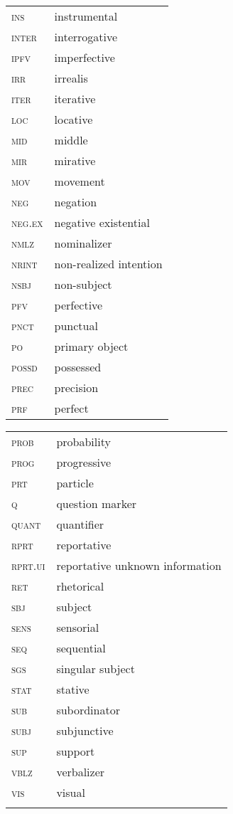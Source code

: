 \documentclass[output=paper,draft,draftmode,colorlinks,citecolor=brown]{langscibook}
\begin{document}
\begin{tabularx}{.45\textwidth}{lQ}
    \textsc{ins}& instrumental\\
    \textsc{inter}& interrogative\\
    \textsc{ipfv}& imperfective\\
    \textsc{irr}& irrealis\\
    \textsc{iter}& iterative\\
    \textsc{loc}& locative\\
    \textsc{mid}& middle\\
    \textsc{mir}& mirative\\
    \textsc{mov}& movement\\
    \textsc{neg}& negation\\
    \textsc{neg.ex}& negative existential\\
    \textsc{nmlz}& nominalizer\\
    \textsc{nrint}& non-realized intention\\
    \textsc{nsbj}& non-subject\\
    \textsc{pfv}& perfective\\
    \textsc{pnct}& punctual\\
    \textsc{po}& primary object\\
    \textsc{possd}& possessed\\ 
    \textsc{prec}& precision\\ 
    \textsc{prf}& perfect\\ 
\end{tabularx}
\begin{tabularx}{.5\textwidth}{lQ}
    \textsc{prob}& probability\\ 
    \textsc{prog}& progressive\\ 
    \textsc{prt}& particle\\ 
    \textsc{q}& question marker\\ 
    \textsc{quant}& quantifier\\ 
    \textsc{rprt}& reportative\\
    \textsc{rprt.ui}& reportative unknown information\\
    \textsc{ret}& rhetorical\\ 
    \textsc{sbj}& subject\\ 
    \textsc{sens}& sensorial\\ 
    \textsc{seq}& sequential\\
    \textsc{sgs}& singular subject\\
    \textsc{stat}& stative\\ 
    \textsc{sub}& subordinator\\ 
    \textsc{subj}& subjunctive\\ 
    \textsc{sup}& support\\ 
    \textsc{vblz}& verbalizer\\
    \textsc{vis}& visual\\
    \\
    \end{tabularx}
\end{document}
